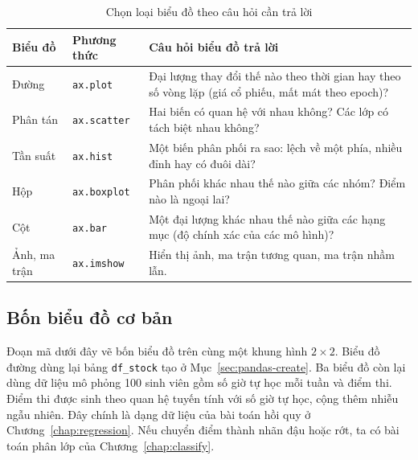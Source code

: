 \begin{table}[H]
\centering
\begin{tabular}{|l|l|p{7cm}|}
\hline
\textbf{Biểu đồ} & \textbf{Phương thức} & \textbf{Câu hỏi biểu đồ trả lời} \\
\hline
Đường & \texttt{ax.plot} & Đại lượng thay đổi thế nào theo thời gian hay theo số vòng lặp (giá cổ phiếu, mất mát theo epoch)? \\ \hline
Phân tán & \texttt{ax.scatter} & Hai biến có quan hệ với nhau không? Các lớp có tách biệt nhau không? \\ \hline
Tần suất & \texttt{ax.hist} & Một biến phân phối ra sao: lệch về một phía, nhiều đỉnh hay có đuôi dài? \\ \hline
Hộp & \texttt{ax.boxplot} & Phân phối khác nhau thế nào giữa các nhóm? Điểm nào là ngoại lai? \\ \hline
Cột & \texttt{ax.bar} & Một đại lượng khác nhau thế nào giữa các hạng mục (độ chính xác của các mô hình)? \\ \hline
Ảnh, ma trận & \texttt{ax.imshow} & Hiển thị ảnh, ma trận tương quan, ma trận nhầm lẫn. \\ \hline
\end{tabular}
\caption{Chọn loại biểu đồ theo câu hỏi cần trả lời}
\label{tab:plot-types}
\end{table}

\subsection{Bốn biểu đồ cơ bản}

Đoạn mã dưới đây vẽ bốn biểu đồ trên cùng một khung hình $2 \times 2$. Biểu đồ đường dùng lại bảng \texttt{df\_stock} tạo ở Mục~\ref{sec:pandas-create}. Ba biểu đồ còn lại dùng dữ liệu mô phỏng 100 sinh viên gồm số giờ tự học mỗi tuần và điểm thi. Điểm thi được sinh theo quan hệ tuyến tính với số giờ tự học, cộng thêm nhiễu ngẫu nhiên. Đây chính là dạng dữ liệu của bài toán hồi quy ở Chương~\ref{chap:regression}. Nếu chuyển điểm thành nhãn đậu hoặc rớt, ta có bài toán phân lớp của Chương~\ref{chap:classify}.

